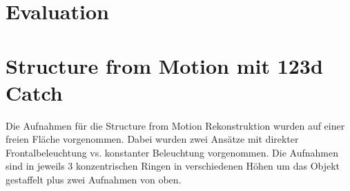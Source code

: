 \documentclass[]{article}
\begin{document}
\section{Evaluation}

\subsection{}
\subsection{}
\subsection{}


\section{Structure from Motion mit 123d Catch}

Die Aufnahmen für die Structure from Motion Rekonstruktion wurden auf einer freien Fläche vorgenommen. Dabei wurden zwei Ansätze mit direkter Frontalbeleuchtung vs. konstanter Beleuchtung vorgenommen.
Die Aufnahmen sind in jeweils 3 konzentrischen Ringen in verschiedenen Höhen um das Objekt gestaffelt plus zwei Aufnahmen von oben.

\subsection{}
\subsection{}
\subsection{}

		
\end{document}
